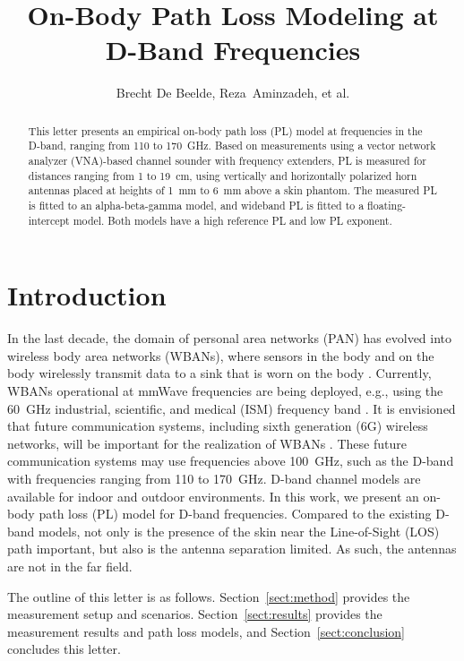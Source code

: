 \documentclass[preprint]{rsl}
\title{On-Body Path Loss Modeling at D-Band Frequencies}
\author{Brecht De Beelde,	%
Reza~Aminzadeh,	%
et al.
}
\begin{document}
\maketitle

%
%

\begin{abstract}
This letter presents an empirical on-body path loss (PL) model at frequencies in the D-band, ranging from 110 to 170~GHz. 
Based on measurements using a vector network analyzer (VNA)-based channel sounder with frequency extenders, PL is measured for distances ranging from 1 to 19~cm, using vertically and horizontally polarized horn antennas placed at heights of 1~mm to 6~mm above a skin phantom.
The measured PL is fitted to an alpha-beta-gamma model, and wideband PL is fitted to a floating-intercept model.
Both models have a high reference PL and low PL exponent. 
\end{abstract}

\section{Introduction\label{sect:intro}}

In the last decade, the domain of personal area networks (PAN) has evolved into wireless body area networks (WBANs), where sensors in the body and on the body  wirelessly transmit data to a sink that is worn on the body \cite{Patel2010}. 
Currently, WBANs operational at mmWave frequencies are being deployed, e.g., using the 60~GHz industrial, scientific, and medical (ISM) frequency band \cite{Aminzadeh2021_tap}.
It is envisioned that future communication systems, including sixth generation (6G) wireless networks, will be important for the realization of WBANs \cite{Cornet2022}.
These future communication systems may use frequencies above 100~GHz, such as the D-band with frequencies ranging from 110 to 170~GHz.
D-band channel models are available for indoor \cite{DeBeelde2021_access, Pometcu2020} and outdoor \cite{DeBeelde2022_tap,DeBeelde2022_wcl} environments. 
In this work, we present an on-body path loss (PL) model for D-band frequencies. 
Compared to the existing D-band models, not only is the presence of the skin near the Line-of-Sight (LOS) path important, but also is the antenna separation limited. 
As such, the antennas are not in the far field. 

The outline of this letter is as follows.
Section~\ref{sect:method} provides the measurement setup and scenarios. 
Section~\ref{sect:results} provides the measurement results and path loss models, and Section~\ref{sect:conclusion} concludes this letter.
\end{document}
